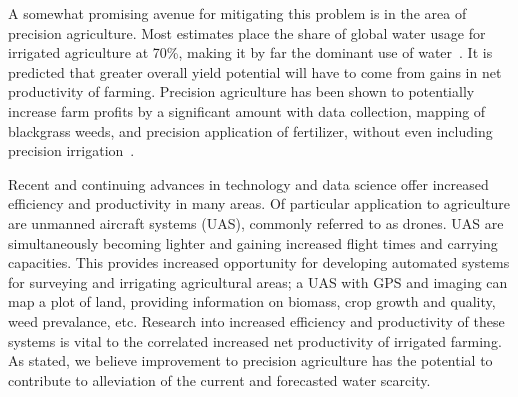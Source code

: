 A somewhat promising avenue for mitigating this problem is in the area of precision agriculture.
Most estimates place the share of global water usage for irrigated agriculture at 70\%, making it by far the dominant use of water~\cite{waterscarce}.
It is predicted that greater overall yield potential will have to come from gains in net productivity of farming.
Precision agriculture has been shown to potentially increase farm profits by a significant amount with data collection, mapping of blackgrass weeds, and precision application of fertilizer, without even including precision irrigation~\cite{precisionagfuture}.


Recent and continuing advances in technology and data science offer increased efficiency and productivity in many areas.
Of particular application to agriculture are unmanned aircraft systems (UAS), commonly referred to as drones.
UAS are simultaneously becoming lighter and gaining increased flight times and carrying capacities.
This provides increased opportunity for developing automated systems for surveying and irrigating agricultural areas; a UAS with GPS and imaging can map a plot of land, providing information on biomass, crop growth and quality, weed prevalance, etc.
Research into increased efficiency and productivity of these systems is vital to the correlated increased net productivity of irrigated farming.
As stated, we believe improvement to precision agriculture has the potential to contribute to alleviation of the current and forecasted water scarcity.





